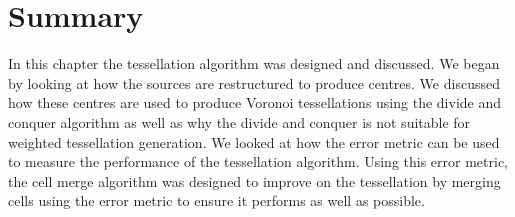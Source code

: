 \section{Summary}
In this chapter the tessellation algorithm was designed and discussed. We began by looking at how the sources are restructured to produce centres. We discussed how these centres are used to produce Voronoi tessellations using the divide and conquer algorithm as well as why the divide and conquer is not suitable for weighted tessellation generation. We looked at how the error metric can be used to measure the performance of the tessellation algorithm. Using this error metric, the cell merge algorithm was designed to improve on the tessellation by merging cells using the error metric to ensure it performs as well as possible.